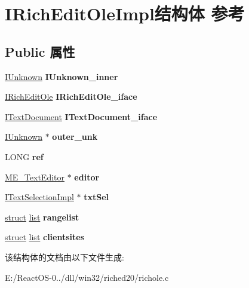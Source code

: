 \hypertarget{struct_i_rich_edit_ole_impl}{}\section{I\+Rich\+Edit\+Ole\+Impl结构体 参考}
\label{struct_i_rich_edit_ole_impl}
\subsection*{Public 属性}
\begin{DoxyCompactItemize}
\item 
\mbox{\label{struct_i_rich_edit_ole_impl_aa381a82b47f9ab01b733bb205c0c1d61}} 
\hyperlink{interface_i_unknown}{I\+Unknown} {\bfseries I\+Unknown\+\_\+inner}
\item 
\mbox{\label{struct_i_rich_edit_ole_impl_a0d4a63d43f1b94106bec47f399935a3a}} 
\hyperlink{interface_i_rich_edit_ole}{I\+Rich\+Edit\+Ole} {\bfseries I\+Rich\+Edit\+Ole\+\_\+iface}
\item 
\mbox{\label{struct_i_rich_edit_ole_impl_a93c6855dfa022858a28f6fc8ce80a196}} 
\hyperlink{interface_i_text_document}{I\+Text\+Document} {\bfseries I\+Text\+Document\+\_\+iface}
\item 
\mbox{\label{struct_i_rich_edit_ole_impl_ae6e34f8832a6d41e9200d05f954f2b8f}} 
\hyperlink{interface_i_unknown}{I\+Unknown} $\ast$ {\bfseries outer\+\_\+unk}
\item 
\mbox{\label{struct_i_rich_edit_ole_impl_a375b471c805ff261e736e55cbf8a50bc}} 
L\+O\+NG {\bfseries ref}
\item 
\mbox{\label{struct_i_rich_edit_ole_impl_aecef654d24920a785e3b93c8069bce60}} 
\hyperlink{structtag_m_e___text_editor}{M\+E\+\_\+\+Text\+Editor} $\ast$ {\bfseries editor}
\item 
\mbox{\label{struct_i_rich_edit_ole_impl_a52a661ffcd7c0ec48fc4804c64edc54e}} 
\hyperlink{struct_i_text_selection_impl}{I\+Text\+Selection\+Impl} $\ast$ {\bfseries txt\+Sel}
\item 
\mbox{\label{struct_i_rich_edit_ole_impl_ac14aa27235fdbe1e213978347fea3f79}} 
\hyperlink{interfacestruct}{struct} \hyperlink{classlist}{list} {\bfseries rangelist}
\item 
\mbox{\label{struct_i_rich_edit_ole_impl_ad4b2ce0d8fcf33a8997bd4d5b9d74eaf}} 
\hyperlink{interfacestruct}{struct} \hyperlink{classlist}{list} {\bfseries clientsites}
\end{DoxyCompactItemize}


该结构体的文档由以下文件生成\+:\begin{DoxyCompactItemize}
\item 
E\+:/\+React\+O\+S-\/0../dll/win32/riched20/richole.\+c\end{DoxyCompactItemize}
